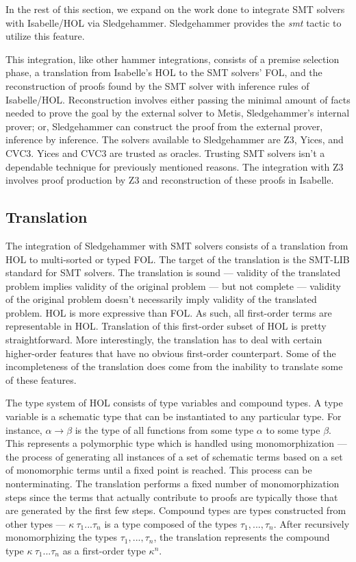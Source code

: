 \documentclass{article}
\begin{document}
	In the rest of this section, we expand on the work 
	done to integrate SMT solvers with Isabelle/HOL via 
	Sledgehammer. Sledgehammer provides the \textit{smt}
	tactic to utilize this feature.
	
	This integration, like other hammer integrations, 
	consists of a premise selection phase, a translation 
	from Isabelle's HOL to the SMT solvers' FOL, and the 
	reconstruction of proofs found by the SMT solver with 
	inference rules of Isabelle/HOL. Reconstruction involves 
	either passing the minimal amount of facts needed 
	to prove the goal by the external solver to Metis, 
	Sledgehammer's internal prover; or, Sledgehammer 
	can construct the proof from the external prover, 
	inference by inference.	The solvers available to 
	Sledgehammer are Z3, Yices, and CVC3. Yices and CVC3 
	are trusted as oracles.	Trusting SMT solvers isn't a 
	dependable technique for previously mentioned reasons. 
	The integration with Z3 involves proof production by 
	Z3 and reconstruction of these proofs in Isabelle.
	
	\subsection{Translation}
		The integration of Sledgehammer with SMT solvers 
		consists of a translation from HOL 
		to multi-sorted or typed FOL. The target 
		of the translation is the SMT-LIB standard for 
		SMT solvers. The translation is sound --- 
		validity of the translated problem implies 
		validity of the original problem --- but not 
		complete --- validity of the original problem 
		doesn't necessarily imply validity of the 
		translated problem. HOL is more expressive 
		than FOL. As such, all first-order terms 
		are representable in HOL. Translation of this 
		first-order subset of HOL is pretty straightforward. 
		More interestingly, the translation has to deal 
		with certain higher-order features that have 
		no obvious first-order counterpart. Some of 
		the incompleteness of the translation does 
		come from the inability to translate some 
		of these features.
		
		The type system of HOL consists 
		of type variables and compound types.
		A type variable is a schematic type that 
		can be instantiated to any particular type.
		For instance, $\alpha \to \beta$ is the type
		of all functions from some type $\alpha$ to
		some type $\beta$. This represents a 
		polymorphic type which is handled using 
		monomorphization --- the process of generating
		all instances of a set of schematic terms based 
		on a set of monomorphic terms until a fixed point
		is reached. This process can be nonterminating. 
		The translation performs a fixed number of 
		monomorphization steps since the terms that 
		actually contribute to proofs are 
		typically those that are generated by the 
		first few steps. Compound types 
		are types constructed from other types --- 
		$\kappa\ \tau_1 ... \tau_n$ is a type composed of 
		the types $\tau_1, ..., \tau_n$. After 
		recursively monomorphizing the types 
		$\tau_1, ..., \tau_n$, the translation 
		represents the compound type 
		$\kappa\ \tau_1 ... \tau_n$ as a first-order 
		type $\kappa^n$.
		
\end{document}
